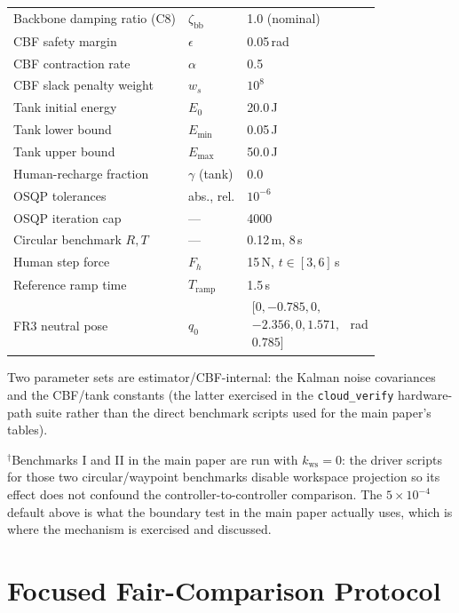 \documentclass[journal]{IEEEtran}
\begin{document}
\begin{table}[!t]
\begin{tabular}{p{2.3cm}p{1.2cm}p{2.5cm}}
Backbone damping ratio (C8) & $\zeta_\text{bb}$ & 1.0 (nominal)\\
CBF safety margin & $\epsilon$ & 0.05\,rad\\
CBF contraction rate & $\alpha$ & 0.5\\
CBF slack penalty weight & $w_s$ & $10^{8}$\\
Tank initial energy & $E_0$ & 20.0\,J\\
Tank lower bound & $E_\text{min}$ & 0.05\,J\\
Tank upper bound & $E_\text{max}$ & 50.0\,J\\
Human-recharge fraction & $\gamma$ (tank) & 0.0\\
OSQP tolerances & abs., rel. & $10^{-6}$\\
OSQP iteration cap & --- & 4000\\
Circular benchmark $R,T$ & --- & 0.12\,m, 8\,s\\
Human step force & $F_h$ & 15\,N, $t\in[3,6]$\,s\\
Reference ramp time & $T_\text{ramp}$ & 1.5\,s\\
FR3 neutral pose & $q_0$ &
$\begin{array}{c}[0,-0.785,0,\\-2.356,0,1.571,\\0.785]\end{array}$ rad\\
\bottomrule
\end{tabular}
\end{table}

Two parameter sets are estimator/CBF-internal: the Kalman noise
covariances and the CBF/tank constants (the latter exercised in the
\texttt{cloud\_verify} hardware-path suite rather than the direct
benchmark scripts used for the main paper's tables).

$^\dagger$Benchmarks I and II in the main paper are run with
$k_\text{ws}=0$: the driver scripts
for those two circular/waypoint benchmarks disable workspace projection
so its effect does not confound the controller-to-controller
comparison. The $5\times10^{-4}$ default above is what the boundary
test in the main paper actually uses, which is where the
mechanism is exercised and discussed.

\section{Focused Fair-Comparison Protocol}\label{sec:fair}
\end{document}
